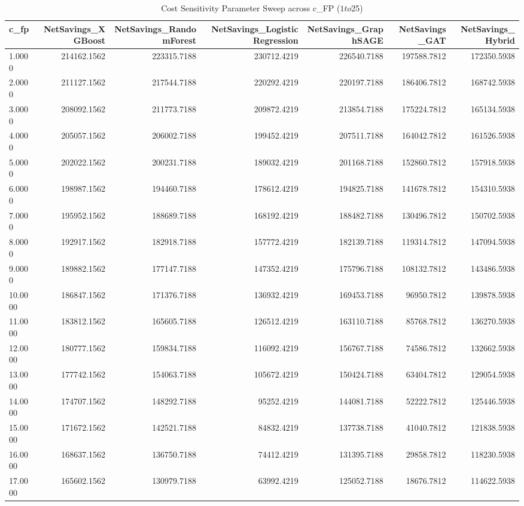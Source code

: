 \begin{table}
\caption{Cost Sensitivity Parameter Sweep across c_FP ($1 to $25)}
\label{tab:cost_sensitivity_sweep}
\begin{tabular}{lrrrrrr}
\toprule
c_fp & NetSavings_XGBoost & NetSavings_RandomForest & NetSavings_LogisticRegression & NetSavings_GraphSAGE & NetSavings_GAT & NetSavings_Hybrid \\
\midrule
1.0000 & 214162.1562 & 223315.7188 & 230712.4219 & 226540.7188 & 197588.7812 & 172350.5938 \\
2.0000 & 211127.1562 & 217544.7188 & 220292.4219 & 220197.7188 & 186406.7812 & 168742.5938 \\
3.0000 & 208092.1562 & 211773.7188 & 209872.4219 & 213854.7188 & 175224.7812 & 165134.5938 \\
4.0000 & 205057.1562 & 206002.7188 & 199452.4219 & 207511.7188 & 164042.7812 & 161526.5938 \\
5.0000 & 202022.1562 & 200231.7188 & 189032.4219 & 201168.7188 & 152860.7812 & 157918.5938 \\
6.0000 & 198987.1562 & 194460.7188 & 178612.4219 & 194825.7188 & 141678.7812 & 154310.5938 \\
7.0000 & 195952.1562 & 188689.7188 & 168192.4219 & 188482.7188 & 130496.7812 & 150702.5938 \\
8.0000 & 192917.1562 & 182918.7188 & 157772.4219 & 182139.7188 & 119314.7812 & 147094.5938 \\
9.0000 & 189882.1562 & 177147.7188 & 147352.4219 & 175796.7188 & 108132.7812 & 143486.5938 \\
10.0000 & 186847.1562 & 171376.7188 & 136932.4219 & 169453.7188 & 96950.7812 & 139878.5938 \\
11.0000 & 183812.1562 & 165605.7188 & 126512.4219 & 163110.7188 & 85768.7812 & 136270.5938 \\
12.0000 & 180777.1562 & 159834.7188 & 116092.4219 & 156767.7188 & 74586.7812 & 132662.5938 \\
13.0000 & 177742.1562 & 154063.7188 & 105672.4219 & 150424.7188 & 63404.7812 & 129054.5938 \\
14.0000 & 174707.1562 & 148292.7188 & 95252.4219 & 144081.7188 & 52222.7812 & 125446.5938 \\
15.0000 & 171672.1562 & 142521.7188 & 84832.4219 & 137738.7188 & 41040.7812 & 121838.5938 \\
16.0000 & 168637.1562 & 136750.7188 & 74412.4219 & 131395.7188 & 29858.7812 & 118230.5938 \\
17.0000 & 165602.1562 & 130979.7188 & 63992.4219 & 125052.7188 & 18676.7812 & 114622.5938 \\

\end{tabular}
\end{table}
